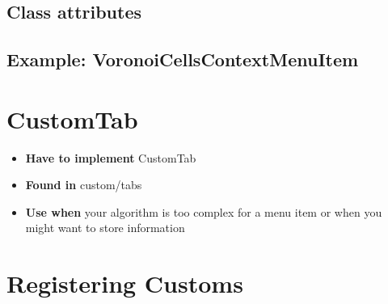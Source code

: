 \subsection{Class attributes}

\subsection{Example: VoronoiCellsContextMenuItem}
\label{subsec:ExampleVoronoiCellsContextMenuItem}

\section{CustomTab}
\label{sec:CustomTab}

\begin{itemize}
	\item \textbf{Have to implement} CustomTab
	\item \textbf{Found in} custom/tabs
	\item \textbf{Use when} your algorithm is too complex for a menu item or when you might want to store information
\end{itemize}



\section{Registering Customs}
\label{sec:RegisterCustoms}